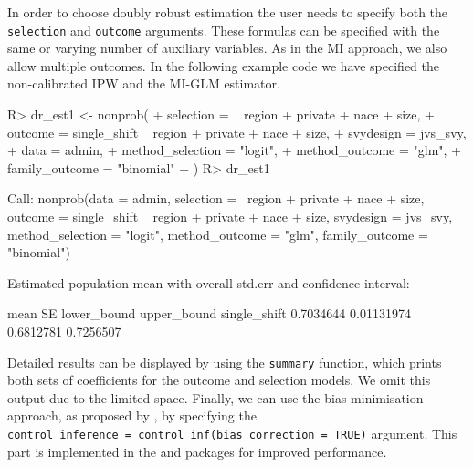 \documentclass[
]{jss}
\begin{document}
In order to choose doubly robust estimation the user needs to specify
both the \texttt{selection} and \texttt{outcome} arguments. These
formulas can be specified with the same or varying number of auxiliary
variables. As in the MI approach, we also allow multiple outcomes. In
the following example code we have specified the non-calibrated IPW and
the MI-GLM estimator.

\begin{CodeChunk}
\begin{CodeInput}
R> dr_est1 <- nonprob(
+   selection = ~ region + private + nace + size,
+   outcome = single_shift ~ region + private + nace + size,
+   svydesign = jvs_svy,
+   data = admin,
+   method_selection = "logit",
+   method_outcome = "glm",
+   family_outcome = "binomial"
+ )
R> dr_est1
\end{CodeInput}
\begin{CodeOutput}

Call:
nonprob(data = admin, selection = ~region + private + nace + 
    size, outcome = single_shift ~ region + private + nace + 
    size, svydesign = jvs_svy, method_selection = "logit", method_outcome = "glm", 
    family_outcome = "binomial")

Estimated population mean with overall std.err and confidence interval:

                  mean         SE lower_bound upper_bound
single_shift 0.7034644 0.01131974   0.6812781   0.7256507
\end{CodeOutput}
\end{CodeChunk}

Detailed results can be displayed by using the \texttt{summary}
function, which prints both sets of coefficients for the outcome and
selection models. We omit this output due to the limited space. Finally,
we can use the bias minimisation approach, as proposed by
\citet{yang_doubly_2020}, by specifying the
\texttt{control\_inference\ =\ control\_inf(bias\_correction\ =\ TRUE)}
argument. This part is implemented in the  \citep{Rcpp} and
 \citep{RcppArmadillo} packages for improved
performance.
\end{document}
